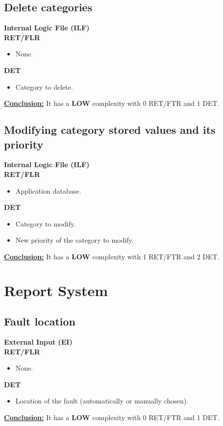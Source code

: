 \subsection{Delete categories}
\textbf{Internal Logic File (ILF)} \\ 
\textbf{RET/FLR}
\begin{itemize}
\item None.
\end{itemize}
\textbf{DET}
\begin{itemize}
\item Category to delete.
\end{itemize}
\textbf{\underline{Conclusion:}} It has a \textbf{LOW} complexity with 0 RET/FTR and 1 DET.

\subsection{Modifying category stored values and its priority}
\textbf{Internal Logic File (ILF)} \\ 
\textbf{RET/FLR}
\begin{itemize}
\item Application database.
\end{itemize}
\textbf{DET}
\begin{itemize}
\item Category to modify.
\item New priority of the category to modify.
\end{itemize}
\textbf{\underline{Conclusion:}} It has a \textbf{LOW} complexity with 1 RET/FTR and 2 DET.	



\section{Report System}



\subsection{Fault location}
\textbf{External Input (EI)} \\ 
\textbf{RET/FLR}
\begin{itemize}
\item None.
\end{itemize}
\textbf{DET}
\begin{itemize}
\item Location of the fault (automatically or manually chosen).
\end{itemize}
\textbf{\underline{Conclusion:}} It has a \textbf{LOW} complexity with 0 RET/FTR and 1 DET.


